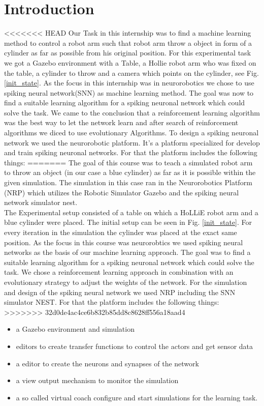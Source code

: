 \section{Introduction}
<<<<<<< HEAD
\label{sec:introtduction}
Our Task in this internship was to find a machine learning method to control a robot arm such that robot arm throw a object in form of a cylinder as far as possible from his original position. For this experimental task we got a Gazebo environment with a Table, a Hollie robot arm who was fixed on the table, a cylinder to throw and a camera which points on the cylinder, see Fig. \ref{init_state}.
As the focus in this internship was in neurorobotics we chose to use spiking neural network(SNN) as machine learning method. The goal was now to find a suitable learning algorithm for a spiking neuronal network which could solve the task. We came to the conclusion that a reinforcement learning algorithm was the best way to let the network learn and after search of reinforcement algorithms we diced to use evolutionary Algorithms. 
To design a spiking neuronal network we used the neurorobotic platform. It's a platform specialized for develop and train spiking neuronal networks. For that the platform includes the following things:
=======
The goal of this course was to teach a simulated robot arm to throw an object (in our case a blue cylinder) as far as it is possible within the given simulation. The simulation in this case ran in the Neurorobotics Platform (NRP) which utilizes the Robotic Simulator Gazebo and the spiking neural network simulator nest.\\%
The Experimental setup consisted of a table on which a HoLLiE robot arm and a blue cylinder were placed.
The initial setup can be seen in Fig. \ref{init_state}. For every iteration in the simulation the cylinder was placed at the exact same position. 
As the focus in this course was neurorobtics we used spiking neural networks as the basis of our machine learning approach.  
The goal was to find a suitable learning algorithm for a spiking neuronal network which could solve the task. We chose a reinforcement learning approach in combination with an evolutionary strategy to adjust the weights of the network.
For the simulation and design of the spiking neural network we used NRP including the SNN simulator NEST. For that the platform includes the following things:
>>>>>>> 32d0de4ac4ce6b832b85dd8c8628ff556a18aad4
 \begin{itemize}
\item a Gazebo environment and simulation
\item editors to create transfer functions to control the actors and get sensor data
\item a editor to create the neurons and synapses of the network
\item a view output mechanism to monitor the simulation
\item a so called virtual coach configure and start simulations for the learning task.
\end{itemize} 

